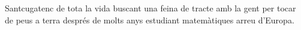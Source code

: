 Santcugatenc de tota la vida buscant una feina de tracte amb la gent per tocar de peus a terra
després de molts anys estudiant matemàtiques arreu d'Europa.
